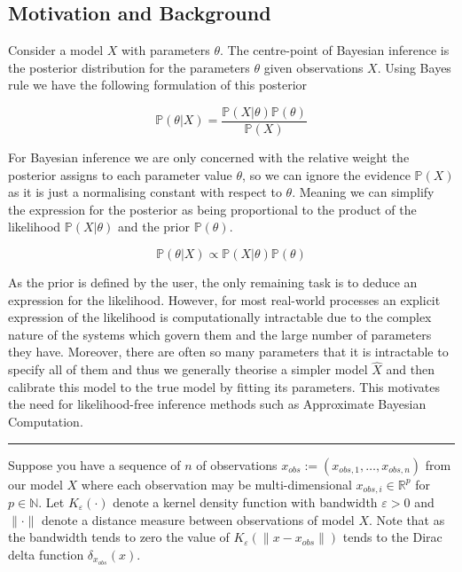 \documentclass[bibliography=totoc,11pt,a4paper,margin=0]{article}
\newcommand*{\prob}{\mathbb{P}}
\theoremstyle{break}
\begin{document}
\subsection{Motivation and Background}\label{sec_ABC_background}

  \par Consider a model $X$ with parameters $\theta$. The centre-point of Bayesian inference is the posterior distribution for the parameters $\theta$ given observations $X$. Using Bayes rule we have the following formulation of this posterior

  \[ \prob(\theta|X)=\frac{\prob(X|\theta)\prob(\theta)}{\prob(X)} \]

  \par For Bayesian inference we are only concerned with the relative weight the posterior assigns to each parameter value $\theta$, so we can ignore the evidence $\prob(X)$ as it is just a normalising constant with respect to $\theta$. Meaning we can simplify the expression for the posterior as being proportional to the product of the likelihood $\prob(X|\theta)$ and the prior $\prob(\theta)$.

  \[ \prob(\theta|X)\propto\prob(X|\theta)\prob(\theta) \]

  \par As the prior is defined by the user, the only remaining task is to deduce an expression for the likelihood. However, for most real-world processes an explicit expression of the likelihood is computationally intractable due to the complex nature of the systems which govern them and the large number of parameters they have. Moreover, there are often so many parameters that it is intractable to specify all of them and thus we generally theorise a simpler model $\hat{X}$ and then calibrate this model to the true model by fitting its parameters. This motivates the need for likelihood-free inference methods such as Approximate Bayesian Computation.

  \begin{center}
    \noindent\rule{.8\textwidth}{0.4pt}
  \end{center}

  \noindent Suppose you have a sequence of $n$ of observations $x_{obs}:=(x_{obs,1},\dots,x_{obs,n})$ from our model $X$ where each observation may be multi-dimensional $x_{obs,i}\in\mathbb{R}^p$ for $p\in\mathbb{N}$. Let $K_\varepsilon(\cdot)$ denote a kernel density function with bandwidth $\varepsilon>0$ and $\|\cdot\|$ denote a distance measure between observations of model $X$. Note that as the bandwidth tends to zero the value of $K_\varepsilon(\|x-x_{obs}\|)$ tends to the Dirac delta function $\delta_{x_{obs}}(x)$.
\end{document}
